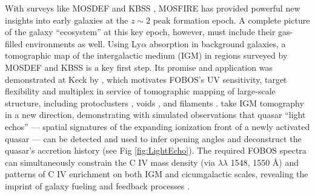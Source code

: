 With surveys like MOSDEF \citep{kriek15} and KBSS
\citep[e.g.,][]{steidel14}, MOSFIRE has provided powerful new
insights into early galaxies at the $z \sim 2$ peak formation epoch.
A complete picture of the galaxy ``ecosystem'' at this key epoch,
however, must include their gas-filled environments as well. Using
Ly$\alpha$ absorption in background galaxies, a tomographic map of
the intergalactic medium (IGM) in regions surveyed by MOSDEF and KBSS
is a key first step. Its promise and application was demonstrated at
Keck by \citet{lee14}, which motivates FOBOS's UV sensitivity, target
flexibility and multiplex in service of tomographic mapping of
large-scale structure, including protoclusters \citep{lee16}, voids
\citep{krolewski18}, and filaments \citep{horowitz19}.
\citet{2018arXiv181005156S} take IGM tomography in a new direction,
demonstrating with simulated observations that quasar ``light echos''
--- spatial signatures of the expanding ionization front of a newly
activated quasar --- can be detected and used to infer opening angles
and deconstruct the quasar's accretion history (see Fig
\ref{fig:LightEcho}). The required FOBOS spectra can simultaneously
constrain the C IV mass density (via $\lambda\lambda$ 1548, 1550 \AA)
and patterns of C IV enrichment on both IGM and cicumgalactic scales,
revealing the imprint of galaxy fueling and feedback processes
\citep[e.g.,][]{tumlinson17}.







